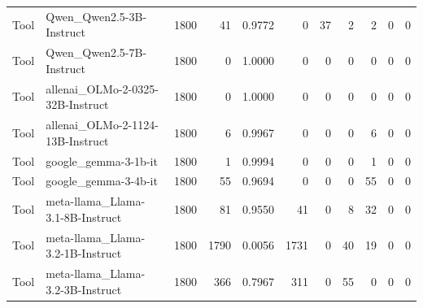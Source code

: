 \begin{tabular}{llrrrrrrrrr}
Tool & Qwen_Qwen2.5-3B-Instruct & 1800 & 41 & 0.9772 & 0 & 37 & 2 & 2 & 0 & 0 \\
Tool & Qwen_Qwen2.5-7B-Instruct & 1800 & 0 & 1.0000 & 0 & 0 & 0 & 0 & 0 & 0 \\
Tool & allenai_OLMo-2-0325-32B-Instruct & 1800 & 0 & 1.0000 & 0 & 0 & 0 & 0 & 0 & 0 \\
Tool & allenai_OLMo-2-1124-13B-Instruct & 1800 & 6 & 0.9967 & 0 & 0 & 0 & 6 & 0 & 0 \\
Tool & google_gemma-3-1b-it & 1800 & 1 & 0.9994 & 0 & 0 & 0 & 1 & 0 & 0 \\
Tool & google_gemma-3-4b-it & 1800 & 55 & 0.9694 & 0 & 0 & 0 & 55 & 0 & 0 \\
Tool & meta-llama_Llama-3.1-8B-Instruct & 1800 & 81 & 0.9550 & 41 & 0 & 8 & 32 & 0 & 0 \\
Tool & meta-llama_Llama-3.2-1B-Instruct & 1800 & 1790 & 0.0056 & 1731 & 0 & 40 & 19 & 0 & 0 \\
Tool & meta-llama_Llama-3.2-3B-Instruct & 1800 & 366 & 0.7967 & 311 & 0 & 55 & 0 & 0 & 0 \\
\bottomrule
\end{tabular}
